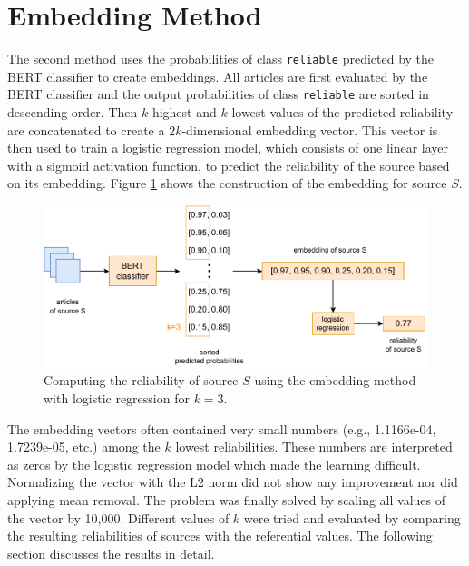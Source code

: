 \section{Embedding Method}
The second method uses the probabilities of class \texttt{reliable} predicted by the BERT classifier to create embeddings. All articles are first evaluated by the BERT classifier and the output probabilities of class \texttt{reliable} are sorted in descending order. Then $k$ highest and $k$ lowest values of the predicted reliability are concatenated to create a $2k$-dimensional embedding vector. This vector is then used to train a logistic regression model, which consists of one linear layer with a sigmoid activation function, to predict the reliability of the source based on its embedding. Figure \ref{fig:embeddings} shows the construction of the embedding for source $S$. 

\begin{figure}[H]
    \centering
    \includegraphics[scale=0.9]{obrazky-figures/embedding.pdf}
    \caption{Computing the reliability of source $S$ using the embedding method with logistic regression for $k=3$.}
    \label{fig:embeddings}
\end{figure}

The embedding vectors often contained very small numbers (e.g., 1.1166e-04, 1.7239e-05, etc.) among the $k$ lowest reliabilities. These numbers are interpreted as zeros by the logistic regression model which made the learning difficult. Normalizing the vector with the L2 norm did not show any improvement nor did applying mean removal. The problem was finally solved by scaling all values of the vector by 10,000. Different values of $k$ were tried and evaluated by comparing the resulting reliabilities of sources with the referential values. The following section discusses the results in detail.


